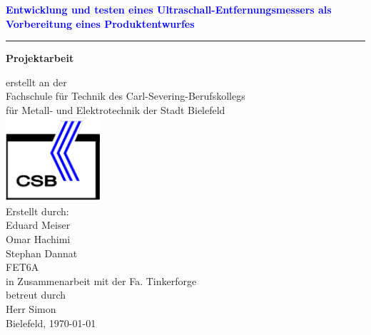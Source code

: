 \begin{center}
\begin{Huge}
\textcolor{blue}{\textbf{Entwicklung und testen eines Ultraschall-Entfernungsmessers als Vorbereitung eines Produktentwurfes}}
\end{Huge}
\rule{\textwidth}{.4pt}
\vspace{1.5cm}

\huge{\textbf{Projektarbeit}}\\
\begin{Large}
erstellt an der\\
Fachschule für Technik des Carl-Severing-Berufskollegs\\
für Metall- und Elektrotechnik der Stadt Bielefeld\\
\includegraphics[width=100pt]{Abbildungen/CSBlogo.png}\\

Erstellt durch:\\
\vspace{12pt}
Eduard Meiser\\Omar Hachimi \\Stephan Dannat\\FET6A\\
\vspace{12pt}
in Zusammenarbeit mit der Fa. Tinkerforge\\
betreut durch\\
Herr Simon\\
Bielefeld, \today
\end{Large}
\end{center}